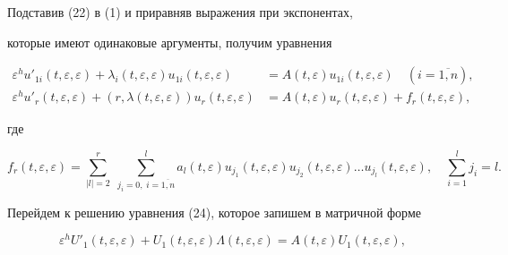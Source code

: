 




\begin{pf}


Подставив (22) в (1) и приравняв выражения при экспонентах,


которые имеют одинаковые аргументы, получим уравнения


\begin{align}


\varepsilon^{h}u'_{1i}(t,\varepsilon,\varepsilon)+


\lambda_{i}(t,\varepsilon,\varepsilon)


u_{1i}(t,\varepsilon,\varepsilon)&=A(t,\varepsilon)


u_{1i}(t,\varepsilon,\varepsilon)\quad (i=\overline{1,n}),\\


%


\varepsilon^{h} u'_{r}


(t,\varepsilon,\varepsilon)+(r,\lambda(t,\varepsilon,\varepsilon))


u_{r} (t,\varepsilon,\varepsilon)&=A(t,\varepsilon)u_{r}


(t,\varepsilon,\varepsilon)+f_{r}


(t,\varepsilon,\varepsilon),


\end{align}


где


$$


f_{r}(t,\varepsilon,\varepsilon)=\sum_{|l|=2}^{r}\;


\sum_{j_{i}=0,\;i=\overline{1,n}}^{l}


a_{l}(t,\varepsilon)u_{j_{1}} (t,\varepsilon,\varepsilon)u_{j_{2}}


(t,\varepsilon,\varepsilon)\dotsc u_{j_{l}}


(t,\varepsilon,\varepsilon),\quad \sum_{i=1}^{l}j_{i}=l.


$$


Перейдем к решению уравнения (24), которое запишем в матричной форме


\begin{equation}\varepsilon^{h}


U'_{1}(t,\varepsilon,\varepsilon)+U_{1}(t,\varepsilon,\varepsilon)


\Lambda(t,\varepsilon,\varepsilon)=A(t,\varepsilon)


U_{1}(t,\varepsilon,\varepsilon),


\end{equation}



\end{pf}
